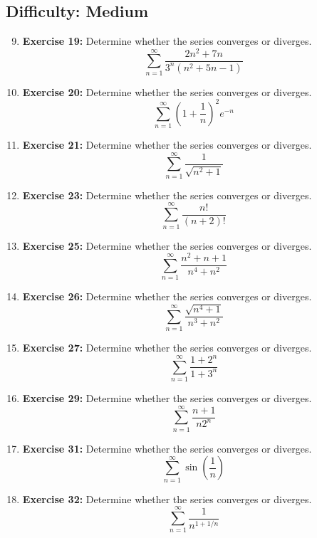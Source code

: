 \documentclass[12pt, a4paper]{article}
\begin{document}
\subsection*{Difficulty: Medium}
\begin{enumerate}
    \setcounter{enumi}{8}
    \item \textbf{Exercise 19:} Determine whether the series converges or diverges.
    \[ \sum_{n=1}^{\infty} \dfrac{2n^2 + 7n}{3^n (n^2 + 5n - 1)} \]

    \item \textbf{Exercise 20:} Determine whether the series converges or diverges.
    \[ \sum_{n=1}^{\infty} \left( 1 + \dfrac{1}{n} \right)^2 e^{-n} \]
    
    \item \textbf{Exercise 21:} Determine whether the series converges or diverges.
    \[ \sum_{n=1}^{\infty} \dfrac{1}{\sqrt{n^2 + 1}} \]

    \item \textbf{Exercise 23:} Determine whether the series converges or diverges.
    \[ \sum_{n=1}^{\infty} \dfrac{n!}{(n+2)!} \]
    
    \item \textbf{Exercise 25:} Determine whether the series converges or diverges.
    \[ \sum_{n=1}^{\infty} \dfrac{n^2 + n + 1}{n^4 + n^2} \]
    
    \item \textbf{Exercise 26:} Determine whether the series converges or diverges.
    \[ \sum_{n=1}^{\infty} \dfrac{\sqrt{n^4 + 1}}{n^3 + n^2} \]

    \item \textbf{Exercise 27:} Determine whether the series converges or diverges.
    \[ \sum_{n=1}^{\infty} \dfrac{1+2^n}{1+3^n} \]
    
    \item \textbf{Exercise 29:} Determine whether the series converges or diverges.
    \[ \sum_{n=1}^{\infty} \dfrac{n+1}{n 2^n} \]
    
    \item \textbf{Exercise 31:} Determine whether the series converges or diverges.
    \[ \sum_{n=1}^{\infty} \sin\left(\dfrac{1}{n}\right) \]
    
    \item \textbf{Exercise 32:} Determine whether the series converges or diverges.
    \[ \sum_{n=1}^{\infty} \dfrac{1}{n^{1+1/n}} \]
\end{enumerate}

\hrulefill
\vspace{1em}
\end{document}
